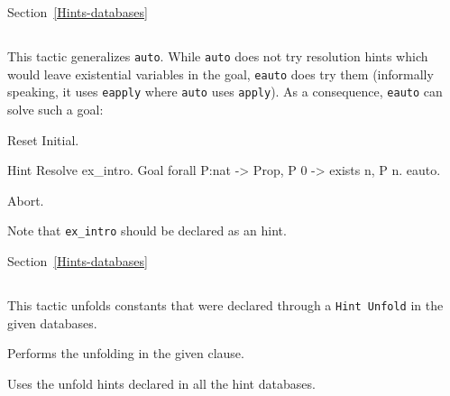 \SeeAlso Section~\ref{Hints-databases}

\subsection{}
\label{eauto}

This tactic generalizes {\tt auto}. While {\tt auto} does not try
resolution hints which would leave existential variables in the goal,
{\tt eauto} does try them (informally speaking, it uses {\tt eapply}
where {\tt auto} uses {\tt apply}).
As a consequence, {\tt eauto} can solve such a goal:

\begin{coq_eval}
Reset Initial.
\end{coq_eval}
\begin{coq_example}
Hint Resolve ex_intro.
Goal forall P:nat -> Prop, P 0 ->  exists n, P n.
eauto.
\end{coq_example}
\begin{coq_eval}
Abort.
\end{coq_eval}

Note that {\tt ex\_intro} should be declared as an
hint.

\SeeAlso Section~\ref{Hints-databases}

\subsection{}
\label{autounfold}

This tactic unfolds constants that were declared through a {\tt Hint
  Unfold} in the given databases.

\begin{Variants}
\item {}

  Performs the unfolding in the given clause.

\item {}

  Uses the unfold hints declared in all the hint databases.
\end{Variants}


\subsection{}
\label{tactic:autorewrite}

